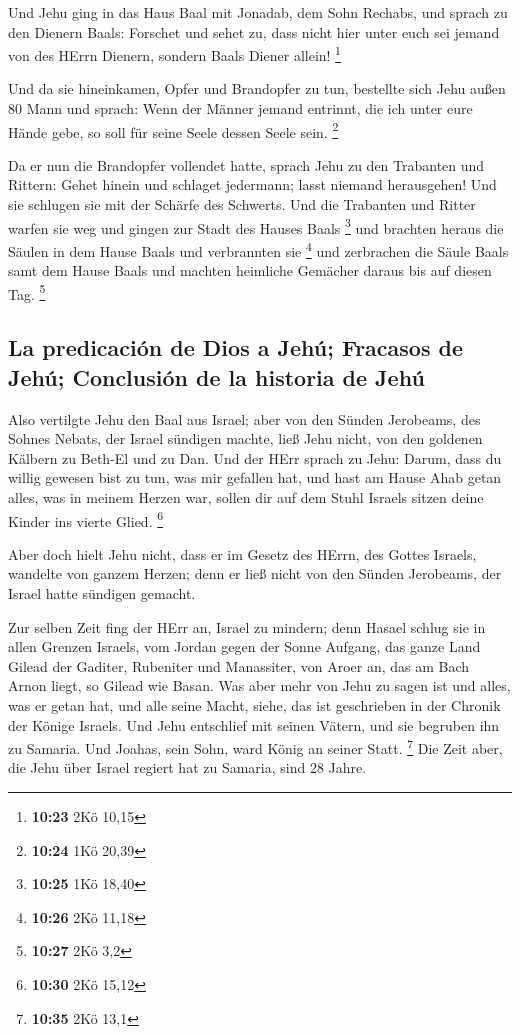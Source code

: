  Und Jehu ging in das Haus Baal mit Jonadab, dem Sohn
Rechabs, und sprach zu den Dienern Baals: Forschet und sehet zu, dass
nicht hier unter euch sei jemand von des HErrn Dienern, sondern Baals
Diener allein! \footnote{\textbf{10:23} 2Kö 10,15}

 Und da sie hineinkamen, Opfer und Brandopfer zu tun,
bestellte sich Jehu außen 80 Mann und sprach: Wenn der Männer jemand
entrinnt, die ich unter eure Hände gebe, so soll für seine Seele dessen
Seele sein. \footnote{\textbf{10:24} 1Kö 20,39}

 Da er nun die Brandopfer vollendet hatte, sprach Jehu zu
den Trabanten und Rittern: Gehet hinein und schlaget jedermann; lasst
niemand herausgehen! Und sie schlugen sie mit der Schärfe des Schwerts.
Und die Trabanten und Ritter warfen sie weg und gingen zur Stadt des
Hauses Baals \footnote{\textbf{10:25} 1Kö 18,40}  und
brachten heraus die Säulen in dem Hause Baals und verbrannten sie
\footnote{\textbf{10:26} 2Kö 11,18}  und zerbrachen die
Säule Baals samt dem Hause Baals und machten heimliche Gemächer daraus
bis auf diesen Tag. \footnote{\textbf{10:27} 2Kö 3,2}

\hypertarget{la-predicaciuxf3n-de-dios-a-jehuxfa-fracasos-de-jehuxfa-conclusiuxf3n-de-la-historia-de-jehuxfa}{%
\subsection{La predicación de Dios a Jehú; Fracasos de Jehú; Conclusión
de la historia de
Jehú}\label{la-predicaciuxf3n-de-dios-a-jehuxfa-fracasos-de-jehuxfa-conclusiuxf3n-de-la-historia-de-jehuxfa}}

 Also vertilgte Jehu den Baal aus Israel; 
aber von den Sünden Jerobeams, des Sohnes Nebats, der Israel sündigen
machte, ließ Jehu nicht, von den goldenen Kälbern zu Beth-El und zu Dan.
 Und der HErr sprach zu Jehu: Darum, dass du willig
gewesen bist zu tun, was mir gefallen hat, und hast am Hause Ahab getan
alles, was in meinem Herzen war, sollen dir auf dem Stuhl Israels sitzen
deine Kinder ins vierte Glied. \footnote{\textbf{10:30} 2Kö 15,12}

 Aber doch hielt Jehu nicht, dass er im Gesetz des HErrn,
des Gottes Israels, wandelte von ganzem Herzen; denn er ließ nicht von
den Sünden Jerobeams, der Israel hatte sündigen gemacht.

 Zur selben Zeit fing der HErr an, Israel zu mindern;
denn Hasael schlug sie in allen Grenzen Israels,  vom
Jordan gegen der Sonne Aufgang, das ganze Land Gilead der Gaditer,
Rubeniter und Manassiter, von Aroer an, das am Bach Arnon liegt, so
Gilead wie Basan.  Was aber mehr von Jehu zu sagen ist
und alles, was er getan hat, und alle seine Macht, siehe, das ist
geschrieben in der Chronik der Könige Israels.  Und Jehu
entschlief mit seinen Vätern, und sie begruben ihn zu Samaria. Und
Joahas, sein Sohn, ward König an seiner Statt. \footnote{\textbf{10:35}
  2Kö 13,1}  Die Zeit aber, die Jehu über Israel regiert
hat zu Samaria, sind 28 Jahre.

